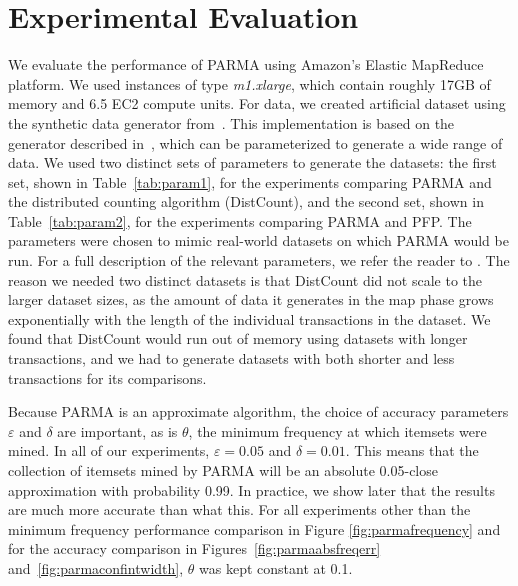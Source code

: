 \section{Experimental Evaluation}
\label{sec:parmaeval}

We evaluate the performance of PARMA using Amazon's Elastic
MapReduce platform. We used instances of type \emph{m1.xlarge}, which
contain roughly 17GB of memory and 6.5 EC2 compute units.
For data, we created artificial dataset using the synthetic data
generator from~\citep{ARTool}. This implementation is based on the
generator described in~\citep{AgrawalS94}, which can be parameterized to generate a wide
range of data. We used two distinct sets of parameters to generate the
datasets: the first set, shown in Table~\ref{tab:param1}, for the experiments
comparing PARMA and the distributed counting algorithm
(DistCount), and the second set, shown in Table~\ref{tab:param2},
for the experiments comparing PARMA and PFP.
The parameters were
chosen to mimic real-world datasets on which PARMA would be run. For a
full description of the relevant parameters, we refer the reader to
\citep{AgrawalS94}.  
The reason we needed two distinct datasets is that DistCount did not scale to
the larger dataset sizes,  as the amount of data it generates in the map phase
grows exponentially with the length of the individual transactions in the
dataset.  We found that DistCount would run out of memory using datasets with
longer transactions, and we had to generate datasets with both shorter and less
transactions for its comparisons. 

Because PARMA is an approximate algorithm, the choice of accuracy
parameters $\varepsilon$ and $\delta$ are important, as is $\theta$,
the minimum frequency at which itemsets were mined. In all of our
experiments, $\varepsilon = 0.05$ and $\delta = 0.01$. This means that
the collection of itemsets mined by PARMA will be an absolute 0.05-close
approximation with probability 0.99. In practice, we show later that the results
are much more accurate than what this. For all experiments other than the
minimum frequency performance comparison in Figure \ref{fig:parmafrequency} and for
the accuracy comparison in Figures~\ref{fig:parmaabsfreqerr}
and~\ref{fig:parmaconfintwidth}, $\theta$ was kept constant at 0.1.

